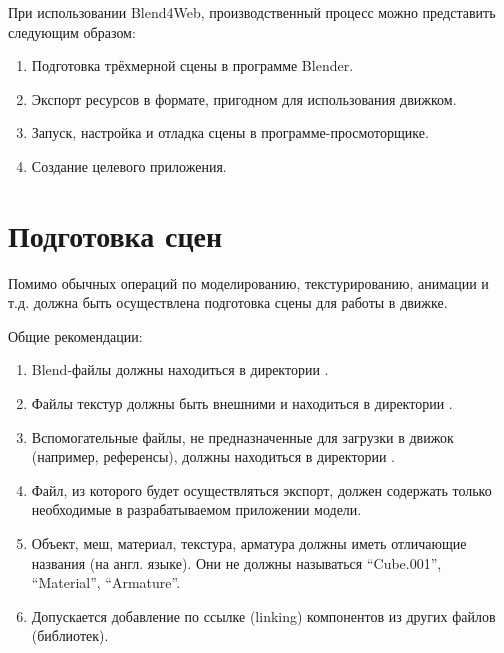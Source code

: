 \documentclass[a4paper,12pt,oneside]{sphinxmanual}
\begin{document}
При использовании Blend4Web, производственный процесс можно представить
следующим образом:
\begin{enumerate}
\item {} 
Подготовка трёхмерной сцены в программе Blender.

\item {} 
Экспорт ресурсов в формате, пригодном для использования движком.

\item {} 
Запуск, настройка и отладка сцены в программе-просмоторщике.

\item {} 
Создание целевого приложения.

\end{enumerate}


\section{Подготовка сцен}
\label{working_process_stages:id2}
Помимо обычных операций по моделированию, текстурированию, анимации и т.д.
должна быть осуществлена подготовка сцены для работы в движке.

Общие рекомендации:
\begin{enumerate}
\item {} 
Blend-файлы должны находиться в директории .

\item {} 
Файлы текстур должны быть внешними и находиться в директории .

\item {} 
Вспомогательные файлы, не предназначенные для загрузки в движок (например, референсы), должны находиться в директории .

\item {} 
Файл, из которого будет осуществляться экспорт, должен содержать только необходимые в разрабатываемом приложении модели.

\item {} 
Объект, меш, материал, текстура, арматура должны иметь отличающие названия (на англ. языке). Они не должны называться ``Cube.001'', ``Material'', ``Armature''.

\item {} 
Допускается добавление по ссылке (linking) компонентов из других файлов (библиотек).

\end{enumerate}
\end{document}
